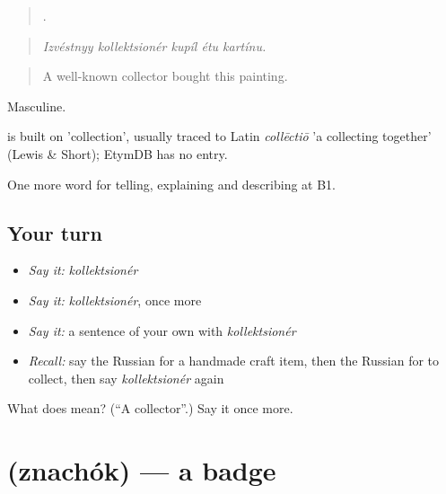 \begin{quote}
    .
\end{quote}

\begin{quote}
\emph{Izvéstnyy kollektsionér kupíl étu kartínu.}
\end{quote}

\begin{quote}
A well-known collector bought this painting.
\end{quote}

Masculine.

\begin{cousinweb}
\emph{} is built on \emph{} 'collection', usually traced to Latin \emph{collēctiō} 'a collecting together' (Lewis \& Short); EtymDB has no entry.
\end{cousinweb}

\begin{grammarlens}[title={What you've built}]
One more word for telling, explaining and describing at B1.
\end{grammarlens}

\subsection*{Your turn}
\begin{itemize}
\raggedright
  \item \emph{Say it:} \emph{kollektsionér}
  \item \emph{Say it:} \emph{kollektsionér}, once more
  \item \emph{Say it:} a sentence of your own with \emph{kollektsionér}
  \item \emph{Recall:} say the Russian for a handmade craft item, then the Russian for to collect, then say \emph{kollektsionér} again
\end{itemize}

\begin{tcolorbox}[breakable,colback=teal!4,colframe=teal!35!black,title={Before you move on}]
What does  mean? (\textquotedblleft{}A collector\textquotedblright{}.) Say it once more.
\end{tcolorbox}
\section[\texorpdfstring{\ru{значок} (znachók)}{значок (znachók)}]{ (znachók) — a badge}

